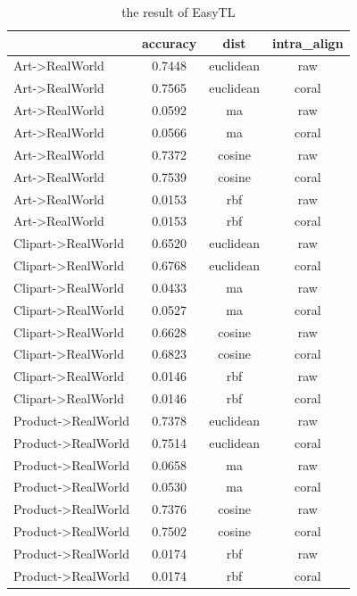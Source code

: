 \documentclass[conference]{IEEEtran}
\begin{document}
\begin{table}[htbp]
	\centering
	\caption{the result of EasyTL}
\begin{tabular}{|l|c|c|c|}
	\hline
	\diagbox{dataset}{result} & accuracy & dist & intra\_align \\
	\hline
	Art->RealWorld & 0.7448  & euclidean & raw \\
	\hline
	Art->RealWorld & 0.7565  & euclidean & coral \\
	\hline
	Art->RealWorld & 0.0592  & ma & raw \\
	\hline
	Art->RealWorld & 0.0566  & ma & coral \\
	\hline
	Art->RealWorld & 0.7372  & cosine & raw \\
	\hline
	Art->RealWorld & 0.7539  & cosine & coral \\
	\hline
	Art->RealWorld & 0.0153  & rbf & raw \\
	\hline
	Art->RealWorld & 0.0153  & rbf & coral \\
	\hline
	Clipart->RealWorld & 0.6520 & euclidean & raw \\
	\hline
	Clipart->RealWorld & 0.6768 & euclidean & coral \\
	\hline
	Clipart->RealWorld & 0.0433 & ma & raw \\
	\hline
	Clipart->RealWorld & 0.0527 & ma & coral \\
	\hline
	Clipart->RealWorld & 0.6628 & cosine & raw \\
	\hline
	Clipart->RealWorld & 0.6823 & cosine & coral \\
	\hline
	Clipart->RealWorld & 0.0146 & rbf & raw \\
	\hline
	Clipart->RealWorld & 0.0146 & rbf & coral \\
	\hline
	Product->RealWorld & 0.7378 & euclidean & raw \\
	\hline
	Product->RealWorld & 0.7514 & euclidean & coral \\
	\hline
	Product->RealWorld & 0.0658 & ma & raw \\
	\hline
	Product->RealWorld & 0.0530 & ma & coral \\
	\hline
	Product->RealWorld & 0.7376 & cosine & raw \\
	\hline
	Product->RealWorld & 0.7502 & cosine & coral \\
	\hline
	Product->RealWorld & 0.0174 & rbf & raw \\
	\hline
	Product->RealWorld & 0.0174 & rbf & coral \\
	\hline
\end{tabular}\label{tab:ETL}
\end{table}
\end{document}

